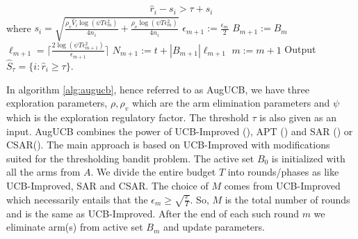 \begin{algorithm}[th!]
\begin{algorithmic}
\begin{align*}
\hat{r}_{i} - s_i  > \tau + s_i
\end{align*}
where $s_i=\sqrt{\frac{\rho_v\hat{V}_{i}\log{(\psi T\epsilon_{m}^{2})}}{4 n_{i}} + \frac{\rho_v \log{(\psi T\epsilon_{m}^{2})}}{4 n_{i}}}$
\EndArmElimV
\State {}
\ResetParam
\State $\epsilon_{m+1}:=\frac{\epsilon_{m}}{2}$
\State $B_{m+1} := B_{m}$
\State $\ell_{m+1}=\bigg\lceil \frac{2\log(\psi T\epsilon_{m+1}^{2})}{\epsilon_{m+1}} \bigg\rceil$
\State $N_{m+1} := t + |B_{m+1}|\ell_{m+1}$
\State $m := m+1$
\EndResetParam
\EndIf
\EndFor
\State Output $\hat{S}_{\tau}=\lbrace i: \hat{r}_{i}\geq \tau \rbrace$.
\end{algorithmic}
\end{algorithm}

In algorithm \ref{alg:augucb}, hence referred to as AugUCB, we have three exploration parameters, $\rho, \rho_v$ which are the arm elimination parameters and $\psi$ which is the exploration regulatory factor. The threshold $\tau$ is also given as an input. AugUCB combines the power of UCB-Improved (\cite{auer2010ucb}), APT (\cite{locatelli2016optimal}) and SAR (\cite{gabillon2011multi}) or CSAR(\cite{chen2014combinatorial}). The main approach is based on UCB-Improved with modifications suited for the thresholding bandit problem. The active set $B_{0}$ is initialized with all the arms from $A$. We divide the entire budget $T$ into rounds/phases as like UCB-Improved, SAR and CSAR. The choice of $M$ comes from UCB-Improved which necessarily entails that the $\epsilon_{m}\geq \sqrt{\frac{e}{T}}$. So, $M$ is the total number of rounds and is the same as UCB-Improved. After the end of each such round $m$ we eliminate arm(s) from active set $B_{m}$ and update parameters. 
	
